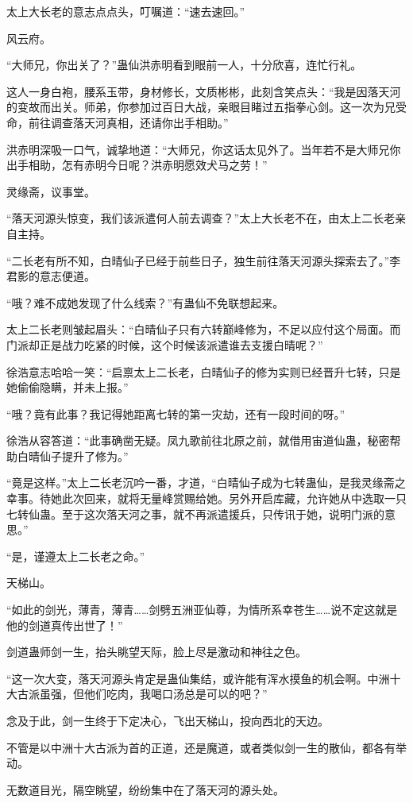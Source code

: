 \begin{this_body}
太上大长老的意志点点头，叮嘱道：“速去速回。”

风云府。

“大师兄，你出关了？”蛊仙洪赤明看到眼前一人，十分欣喜，连忙行礼。

这人一身白袍，腰系玉带，身材修长，文质彬彬，此刻含笑点头：“我是因落天河的变故而出关。师弟，你参加过百日大战，亲眼目睹过五指拳心剑。这一次为兄受命，前往调查落天河真相，还请你出手相助。”

洪赤明深吸一口气，诚挚地道：“大师兄，你这话太见外了。当年若不是大师兄你出手相助，怎有赤明今日呢？洪赤明愿效犬马之劳！”

灵缘斋，议事堂。

“落天河源头惊变，我们该派遣何人前去调查？”太上大长老不在，由太上二长老亲自主持。

“二长老有所不知，白晴仙子已经于前些日子，独生前往落天河源头探索去了。”李君影的意志便道。

“哦？难不成她发现了什么线索？”有蛊仙不免联想起来。

太上二长老则皱起眉头：“白晴仙子只有六转巅峰修为，不足以应付这个局面。而门派却正是战力吃紧的时候，这个时候该派遣谁去支援白晴呢？”

徐浩意志哈哈一笑：“启禀太上二长老，白晴仙子的修为实则已经晋升七转，只是她偷偷隐瞒，并未上报。”

“哦？竟有此事？我记得她距离七转的第一灾劫，还有一段时间的呀。”

徐浩从容答道：“此事确凿无疑。凤九歌前往北原之前，就借用宙道仙蛊，秘密帮助白晴仙子提升了修为。”

“竟是这样。”太上二长老沉吟一番，才道，“白晴仙子成为七转蛊仙，是我灵缘斋之幸事。待她此次回来，就将无量峰赏赐给她。另外开启库藏，允许她从中选取一只七转仙蛊。至于这次落天河之事，就不再派遣援兵，只传讯于她，说明门派的意思。”

“是，谨遵太上二长老之命。”

天梯山。

“如此的剑光，薄青，薄青……剑劈五洲亚仙尊，为情所系幸苍生……说不定这就是他的剑道真传出世了！”

剑道蛊师剑一生，抬头眺望天际，脸上尽是激动和神往之色。

“这一次大变，落天河源头肯定是蛊仙集结，或许能有浑水摸鱼的机会啊。中洲十大古派虽强，但他们吃肉，我喝口汤总是可以的吧？”

念及于此，剑一生终于下定决心，飞出天梯山，投向西北的天边。

不管是以中洲十大古派为首的正道，还是魔道，或者类似剑一生的散仙，都各有举动。

无数道目光，隔空眺望，纷纷集中在了落天河的源头处。


\end{this_body}
